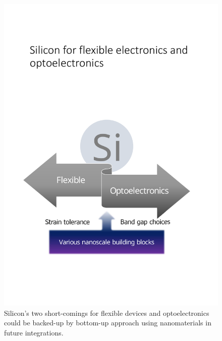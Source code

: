 \begin{figure}  
\centering
\includegraphics[width=340pt]{figures/figure1_silicon.pdf}
\caption[Future of optoelectronics and flexible electronics]{Silicon's two short-comings for flexible devices and optoelectronics could be backed-up by bottom-up approach using nanomaterials in future integrations.
\label{fig:1si}}
\end{figure}

